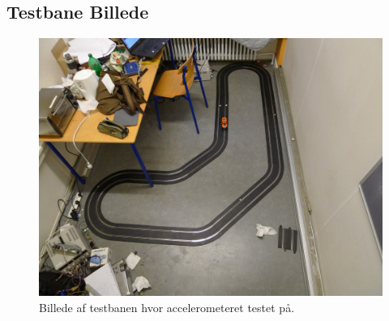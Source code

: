 \subsection{Testbane Billede}
\label{testbanebillede}

\begin{figure}[h!]
\includegraphics[scale=0.2]{./Graphics/testbane}
\caption{Billede af testbanen hvor accelerometeret testet på.}
\end{figure}